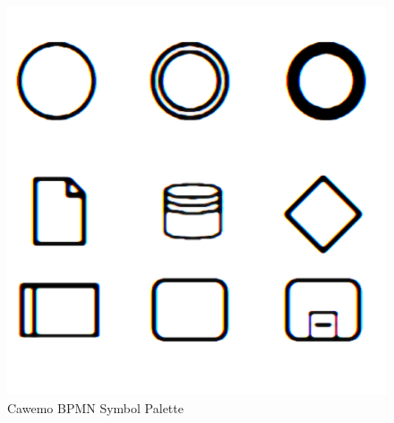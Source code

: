 \documentclass[]{book}
\begin{document}
\begin{figure}
\centering
\includegraphics{images/cawemopalette.png}
\caption{Cawemo BPMN Symbol Palette}
\end{figure}
\end{document}
